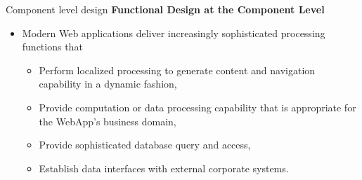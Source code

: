 \documentclass{beamer}
\begin{document}
\begin{frame}{Component level design}
	\textbf{Functional Design at the Component Level }
	\begin{itemize}
		\item Modern Web applications deliver increasingly sophisticated processing functions that 
		\begin{itemize}
			\item Perform localized processing to generate content and navigation capability in a dynamic fashion, 
			\item Provide computation or data processing capability that is appropriate for the WebApp’s business domain, 
		\item Provide sophisticated database query and access, 
			\item Establish data interfaces with external corporate systems. 
		\end{itemize}
	\end{itemize}	
\end{frame}
\end{document}

